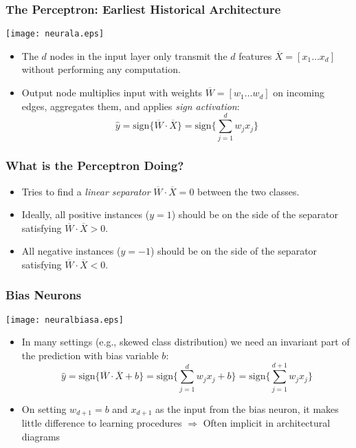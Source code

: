 \begin{frame}
\frametitle{The Perceptron: Earliest Historical Architecture}
\begin{center}
\texttt{[image: neurala.eps]}
\end{center}
\begin{itemize}
\item The  $d$ nodes in the input layer only transmit the $d$
features $\overline{X}=[x_1 \ldots x_d]$ without performing any
computation.
\item  Output
node   multiplies input with  weights $\overline{W}=[w_1 \ldots
w_d]$ on incoming edges, aggregates them, and applies  {\em sign
activation}:
\begin{equation*}
\hat{y}= \mbox{sign}\{ \overline{W}\cdot \overline{X} \} =
\mbox{sign}\{ \sum_{j=1}^d w_j x_j \} \label{1nobias}
\end{equation*}
\end{itemize}
\end{frame}



\begin{frame}
\frametitle{What is the Perceptron Doing?}
\begin{itemize}
\item Tries to find a {\em linear separator} $\overline{W}\cdot \overline{X}=0$ between the two
classes. \item  Ideally, all positive instances ($y=1$) should be on
the side of the separator satisfying $\overline{W} \cdot
\overline{X}>0$.
 \item  All negative  instances ($y=-1$) should be on the
side of the separator satisfying $\overline{W} \cdot
\overline{X}<0$.
\end{itemize}
\end{frame}



\begin{frame}
\frametitle{Bias Neurons}
\begin{center}
\texttt{[image: neuralbiasa.eps]}
\end{center}
\begin{itemize}
\item  In many settings (e.g., skewed class distribution) we need an
invariant part of the prediction with bias variable $b$:
\begin{equation*}
\hat{y}= \mbox{sign}\{ \overline{W}\cdot \overline{X} +b \} =
\mbox{sign}\{ \sum_{j=1}^d w_j x_j  + b  \} = \mbox{sign}\{
\sum_{j=1}^{d+1} w_j x_j    \}
\end{equation*}
\item On setting $w_{d+1}=b$ and $x_{d+1}$ as the input from the
bias neuron, it makes little difference to learning procedures
$\Rightarrow$ Often implicit in architectural diagrams
\end{itemize}
\end{frame}


